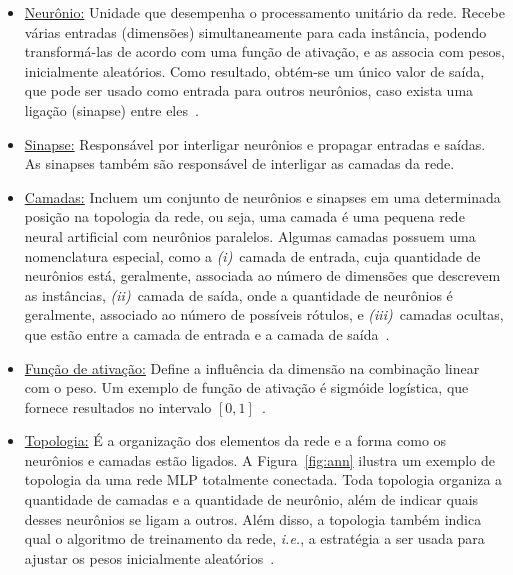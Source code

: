 \begin{itemize}
    \item {\underline{Neurônio:}} Unidade que desempenha o processamento unitário da rede.
    Recebe várias entradas (dimensões) simultaneamente para cada instância, podendo transformá-las de acordo com uma função de ativação, e as associa com pesos, inicialmente aleatórios.
    Como resultado, obtém-se um único valor de saída, que pode ser usado como entrada para outros neurônios, caso exista uma ligação (sinapse) entre eles~\cite{Zhang1998,Aggarwal2015}.
    
    \item \underline{Sinapse:} Responsável por interligar neurônios e propagar entradas e saídas.
    As sinapses também são responsável de interligar as camadas da rede.

    \item \underline{Camadas:} Incluem um conjunto de neurônios e sinapses em uma determinada posição na topologia da rede, ou seja, uma camada é uma pequena rede neural artificial com neurônios paralelos.
    Algumas camadas possuem uma nomenclatura especial, como a 
    \textit{(i)}~camada de entrada, cuja quantidade de neurônios está, geralmente, associada ao número de dimensões que descrevem as instâncias,
    \textit{(ii)}~camada de saída, onde a quantidade de neurônios é geralmente, associado ao número de possíveis rótulos, e
    \textit{(iii)}~camadas ocultas, que estão entre a camada de entrada e a camada de saída~\cite{Hecht1988,Zhang1998}.
    
    \item \underline{Função de ativação:} Define a influência da dimensão na combinação linear com o peso. 
    Um exemplo de função de ativação é sigmóide logística, que fornece resultados no intervalo $[0,1]$~\cite{Lippmann1987,Jain1996}. 
    
    \item \underline{Topologia:} É a organização dos elementos da rede e a forma como os neurônios e camadas estão ligados.
    A Figura~\ref{fig:ann} ilustra um exemplo de topologia da uma rede MLP totalmente conectada.
    Toda topologia organiza a quantidade de camadas e a quantidade de neurônio, além de indicar quais desses neurônios se ligam a outros.
    Além disso, a topologia também indica qual o algoritmo de treinamento da rede, \textit{i.e.}, a estratégia a ser usada para ajustar os pesos inicialmente aleatórios~\cite{Kwok1997,Russell2016}.
 
\end{itemize}

